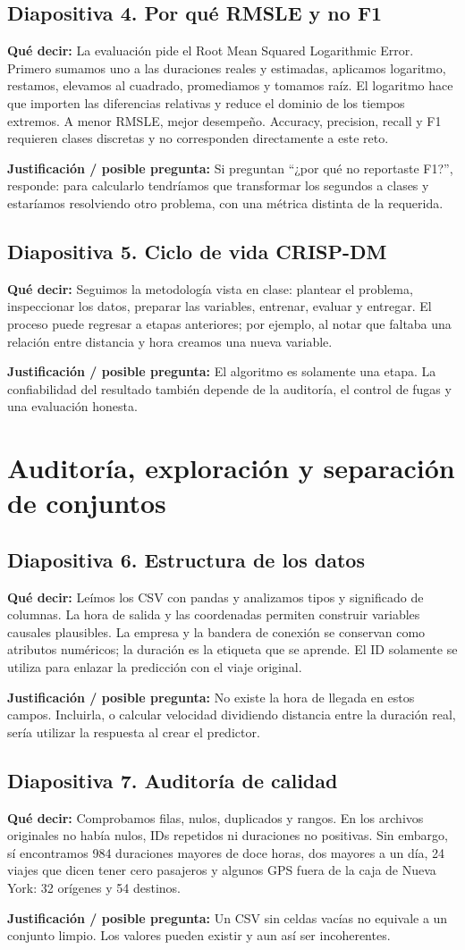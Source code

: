 \documentclass[11pt,letterpaper]{article}
\newcommand{\lamina}[2]{\subsection*{Diapositiva #1. #2}}
\newcommand{\explica}[1]{\noindent\textcolor{azul}{\textbf{Qué decir:}} #1\par\smallskip}
\newcommand{\defiende}[1]{\noindent\textcolor{verde}{\textbf{Justificación / posible pregunta:}} #1\par\medskip}
\begin{document}
\lamina{4}{Por qué RMSLE y no F1}
\explica{La evaluación pide el Root Mean Squared Logarithmic Error. Primero sumamos uno a las duraciones reales y estimadas, aplicamos logaritmo, restamos, elevamos al cuadrado, promediamos y tomamos raíz. El logaritmo hace que importen las diferencias relativas y reduce el dominio de los tiempos extremos. A menor RMSLE, mejor desempeño. Accuracy, precision, recall y F1 requieren clases discretas y no corresponden directamente a este reto.}
\defiende{Si preguntan ``¿por qué no reportaste F1?'', responde: para calcularlo tendríamos que transformar los segundos a clases y estaríamos resolviendo otro problema, con una métrica distinta de la requerida.}

\lamina{5}{Ciclo de vida CRISP-DM}
\explica{Seguimos la metodología vista en clase: plantear el problema, inspeccionar los datos, preparar las variables, entrenar, evaluar y entregar. El proceso puede regresar a etapas anteriores; por ejemplo, al notar que faltaba una relación entre distancia y hora creamos una nueva variable.}
\defiende{El algoritmo es solamente una etapa. La confiabilidad del resultado también depende de la auditoría, el control de fugas y una evaluación honesta.}

\section{Auditoría, exploración y separación de conjuntos}
\lamina{6}{Estructura de los datos}
\explica{Leímos los CSV con pandas y analizamos tipos y significado de columnas. La hora de salida y las coordenadas permiten construir variables causales plausibles. La empresa y la bandera de conexión se conservan como atributos numéricos; la duración es la etiqueta que se aprende. El ID solamente se utiliza para enlazar la predicción con el viaje original.}
\defiende{No existe la hora de llegada en estos campos. Incluirla, o calcular velocidad dividiendo distancia entre la duración real, sería utilizar la respuesta al crear el predictor.}

\lamina{7}{Auditoría de calidad}
\explica{Comprobamos filas, nulos, duplicados y rangos. En los archivos originales no había nulos, IDs repetidos ni duraciones no positivas. Sin embargo, sí encontramos 984 duraciones mayores de doce horas, dos mayores a un día, 24 viajes que dicen tener cero pasajeros y algunos GPS fuera de la caja de Nueva York: 32 orígenes y 54 destinos.}
\defiende{Un CSV sin celdas vacías no equivale a un conjunto limpio. Los valores pueden existir y aun así ser incoherentes.}
\end{document}
